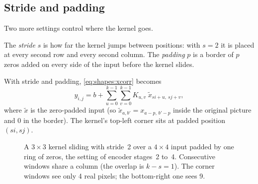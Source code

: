 \subsection{Stride and padding}

Two more settings control where the kernel goes.

\begin{definition}
The \emph{stride} $s$ is how far the kernel jumps between positions:
with $s=2$ it is placed at every second row and every second column. The \emph{padding}
$p$ is a border of $p$ zeros added on every side of the input before the kernel slides.
\end{definition}

With stride and padding, \cref{eq:shapes:xcorr} becomes
\begin{equation}\label{eq:shapes:xcorrsp}
y_{i,j} = b + \sum_{u=0}^{k-1}\sum_{v=0}^{k-1} K_{u,v}\; \tilde{x}_{s i+u,\ s j+v},
\end{equation}
where $\tilde{x}$ is the zero-padded input (so $\tilde{x}_{a,b'} = x_{a-p,\,b'-p}$ inside the original
picture and $0$ in the border). The kernel's top-left corner sits at padded position $(si, sj)$.

\begin{figure}[htbp]\centering
{}
\caption{A $3\times3$ kernel sliding with stride~2 over a $4\times4$ input padded by one ring of zeros,
the setting of encoder stages~2 to~4. Consecutive windows share a column (the overlap is $k-s=1$). The
corner windows see only 4 real pixels; the bottom-right one sees 9.}
\label{fig:shapes:slide}
\end{figure}

